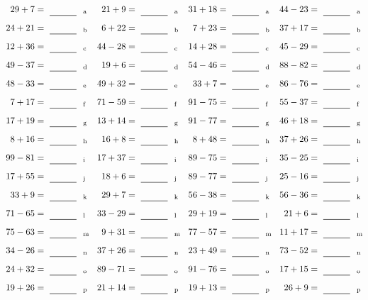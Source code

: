 \documentclass
[
  draft    = true,
  fontsize = 11pt,
  parskip  = half-
]
{scrartcl}
\begin{document}
\clearpage
\begin{align*}
    \pline{29+7}&=\rline{a}
  & \pline{21+9}&=\rline{a}
  & \pline{31+18}&=\rline{a}
  & \pline{44-23}&=\rline{a} \\[1ex]
    \pline{24+21}&=\rline{b}
  & \pline{6+22}&=\rline{b}
  & \pline{7+23}&=\rline{b}
  & \pline{37+17}&=\rline{b} \\[1ex]
    \pline{12+36}&=\rline{c}
  & \pline{44-28}&=\rline{c}
  & \pline{14+28}&=\rline{c}
  & \pline{45-29}&=\rline{c} \\[1ex]
    \pline{49-37}&=\rline{d}
  & \pline{19+6}&=\rline{d}
  & \pline{54-46}&=\rline{d}
  & \pline{88-82}&=\rline{d} \\[1ex]
    \pline{48-33}&=\rline{e}
  & \pline{49+32}&=\rline{e}
  & \pline{33+7}&=\rline{e}
  & \pline{86-76}&=\rline{e} \\[1ex]
    \pline{7+17}&=\rline{f}
  & \pline{71-59}&=\rline{f}
  & \pline{91-75}&=\rline{f}
  & \pline{55-37}&=\rline{f} \\[1ex]
    \pline{17+19}&=\rline{g}
  & \pline{13+14}&=\rline{g}
  & \pline{91-77}&=\rline{g}
  & \pline{46+18}&=\rline{g} \\[1ex]
    \pline{8+16}&=\rline{h}
  & \pline{16+8}&=\rline{h}
  & \pline{8+48}&=\rline{h}
  & \pline{37+26}&=\rline{h} \\[1ex]
    \pline{99-81}&=\rline{i}
  & \pline{17+37}&=\rline{i}
  & \pline{89-75}&=\rline{i}
  & \pline{35-25}&=\rline{i} \\[1ex]
    \pline{17+55}&=\rline{j}
  & \pline{18+6}&=\rline{j}
  & \pline{89-77}&=\rline{j}
  & \pline{25-16}&=\rline{j} \\[1ex]
    \pline{33+9}&=\rline{k}
  & \pline{29+7}&=\rline{k}
  & \pline{56-38}&=\rline{k}
  & \pline{56-36}&=\rline{k} \\[1ex]
    \pline{71-65}&=\rline{l}
  & \pline{33-29}&=\rline{l}
  & \pline{29+19}&=\rline{l}
  & \pline{21+6}&=\rline{l} \\[1ex]
    \pline{75-63}&=\rline{m}
  & \pline{9+31}&=\rline{m}
  & \pline{77-57}&=\rline{m}
  & \pline{11+17}&=\rline{m} \\[1ex]
    \pline{34-26}&=\rline{n}
  & \pline{37+26}&=\rline{n}
  & \pline{23+49}&=\rline{n}
  & \pline{73-52}&=\rline{n} \\[1ex]
    \pline{24+32}&=\rline{o}
  & \pline{89-71}&=\rline{o}
  & \pline{91-76}&=\rline{o}
  & \pline{17+15}&=\rline{o} \\[1ex]
    \pline{19+26}&=\rline{p}
  & \pline{21+14}&=\rline{p}
  & \pline{19+13}&=\rline{p}
  & \pline{26+9}&=\rline{p}
\end{align*}
\end{document}
